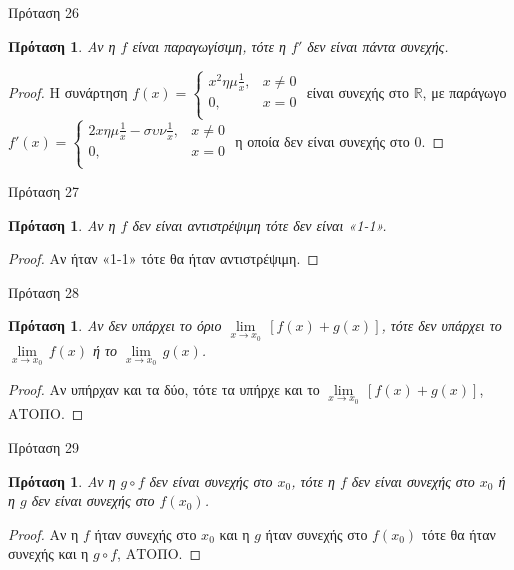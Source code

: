 \documentclass[greek]{beamer}
\newtheorem{proposition}[theorem]{Πρόταση}
\begin{document}
\begin{frame}{Πρόταση 26}
 \begin{proposition}
  \normalfont Αν η $f$ είναι παραγωγίσιμη, τότε η $f'$ δεν είναι πάντα συνεχής.
 \end{proposition}
 \begin{proof}
  Η συνάρτηση $f\left( x \right)=\left\{ \begin{array}{*{35}{l}}
    {{x}^{2}}\eta \mu \frac{1}{x}, & x\ne 0 \\
    0,                             & x=0    \\
   \end{array} \right.$ είναι συνεχής στο $\mathbb{R}$, με παράγωγο $f'\left( x \right)=\left\{ \begin{array}{*{35}{l}}
    2x\eta \mu \frac{1}{x}-\sigma \upsilon \nu \frac{1}{x}, & x\ne 0 \\
    0,                                                      & x=0    \\
   \end{array} \right.$ η οποία δεν είναι συνεχής στο $0$.
 \end{proof}
\end{frame}

\begin{frame}{Πρόταση 27}
 \begin{proposition}
  \normalfont Αν η $f$ δεν είναι αντιστρέψιμη τότε δεν είναι «1-1».
 \end{proposition}
 \begin{proof}
  Αν ήταν «1-1» τότε θα ήταν αντιστρέψιμη.
 \end{proof}
\end{frame}

\begin{frame}{Πρόταση 28}
 \begin{proposition}
  \normalfont Αν δεν υπάρχει το όριο $\underset{x\to {{x}_{0}}}{\mathop{\lim }}\,\left[ f\left( x \right)+g\left( x \right) \right]$, τότε δεν υπάρχει το $\underset{x\to {{x}_{0}}}{\mathop{\lim }}\,f\left( x \right)$ ή το $\underset{x\to {{x}_{0}}}{\mathop{\lim }}\,g\left( x \right)$.
 \end{proposition}
 \begin{proof}
  Αν υπήρχαν και τα δύο, τότε τα υπήρχε και το $\underset{x\to {{x}_{0}}}{\mathop{\lim }}\,\left[ f\left( x \right)+g\left( x \right) \right]$, ΑΤΟΠΟ.
 \end{proof}
\end{frame}

\begin{frame}{Πρόταση 29}
 \begin{proposition}
  \normalfont Αν η $g\circ f$ δεν είναι συνεχής στο ${{x}_{0}}$, τότε η $f$ δεν είναι συνεχής στο ${{x}_{0}}$ ή η $g$ δεν είναι συνεχής στο $f\left( {{x}_{0}} \right)$.
 \end{proposition}
 \begin{proof}
  Αν η $f$ ήταν συνεχής στο ${{x}_{0}}$ και η $g$ ήταν συνεχής στο $f\left( {{x}_{0}} \right)$ τότε θα ήταν συνεχής και η $g\circ f$, ΑΤΟΠΟ.
 \end{proof}
\end{frame}
\end{document}
